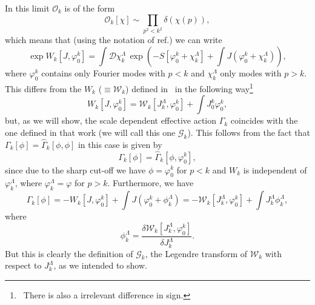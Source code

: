 \documentclass[a4paper,12pt]{article}
\begin{document}
In this limit ${\mathcal O}_k$ is of the form
\begin{equation}
               {\mathcal O}_k [\chi] \sim \prod_{p^2<k^2} \delta(\chi(p)),
\end{equation}
which means that (using the notation of ref.\cite{Bra02}) we can write
\begin{equation}
               \exp{W_k[J,\varphi_0^k]}=\int{\mathcal D}\chi_k^{\Lambda}\,\exp{\left(-S[\varphi_0^k+\chi_k^{\Lambda}]+\int J(\varphi_0^k+\chi_k^{\Lambda})\right)},
\end{equation}
where $\varphi_0^k$ contains only Fourier modes with $p<k$ and $\chi_k^{\Lambda}$ only modes with $p>k$. This differs from the $W_k$ ($\equiv {\mathcal W}_k$) defined in~\cite{Bra02} in the following way\footnote{~There is also a irrelevant difference in sign.}
\begin{equation}
               W_k [J,\varphi_0^k]=  {\mathcal W}_k [J_k^{\Lambda},\varphi_0^k] +\int J_0^k \varphi_0^k,
\end{equation}          
but, as we will show, the scale dependent effective action $\Gamma_k$ coincides with the one defined in that work (we will call this one ${\mathcal G}_k$). This follows from the fact that $\Gamma_k[\phi]= \widehat{\Gamma}_k[\phi,\phi]$ in this case is given by
\begin{equation}
               \Gamma_k[\phi]=\widehat{\Gamma}_k[\phi,\varphi_0^k],
\end{equation}
since due to the sharp cut-off we have $\phi=\varphi_0^k$ for $p<k$ and $W_k$ is independent of $\varphi_k^{\Lambda}$, where $ \varphi_k^{\Lambda}=\varphi$ for $p>k$. Furthermore, we have
\begin{equation}
               \Gamma_k[\phi]=-W_k[J,\varphi_0^k]+\int J(\varphi_0^k+\phi_k^{\Lambda})=-{\mathcal W}_k [J_k^{\Lambda},\varphi_0^k]+\int J_k^{\Lambda}\phi_k^{\Lambda},
\end{equation}
where
\begin{equation}
               \phi_k^{\Lambda}=\frac{\delta {\mathcal W}_k [J_k^{\Lambda},\varphi_0^k]}{\delta J_k^{\Lambda}}.
\end{equation}     
But this is clearly the definition of ${\mathcal G}_k$, the Legendre transform of ${\mathcal W}_k$ with respect to $J_k^{\Lambda}$, as we intended to show.
\end{document}
